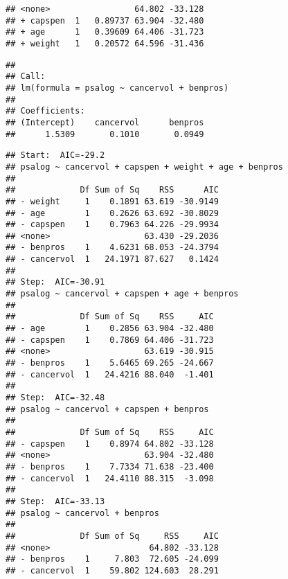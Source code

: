 \begin{knitrout}
\begin{kframe}
\begin{verbatim}
## <none>                 64.802 -33.128
## + capspen  1   0.89737 63.904 -32.480
## + age      1   0.39609 64.406 -31.723
## + weight   1   0.20572 64.596 -31.436
\end{verbatim}
\begin{alltt}
\end{alltt}
\begin{verbatim}
##
## Call:
## lm(formula = psalog ~ cancervol + benpros)
##
## Coefficients:
## (Intercept)    cancervol      benpros
##      1.5309       0.1010       0.0949
\end{verbatim}
\begin{alltt}
 \hlkwb{<-}
    \hlstd{(} \hlopt{~}  \hlopt{+}  \hlopt{+}  \hlopt{+}  \hlopt{+} 
     \hlstd{=} \hlstd{(} \hlstd{=} \hlopt{~}\hlstd{),}
     \hlstd{=} \hlstd{)}
\end{alltt}
\begin{verbatim}
## Start:  AIC=-29.2
## psalog ~ cancervol + capspen + weight + age + benpros
##
##             Df Sum of Sq    RSS      AIC
## - weight     1    0.1891 63.619 -30.9149
## - age        1    0.2626 63.692 -30.8029
## - capspen    1    0.7963 64.226 -29.9934
## <none>                   63.430 -29.2036
## - benpros    1    4.6231 68.053 -24.3794
## - cancervol  1   24.1971 87.627   0.1424
##
## Step:  AIC=-30.91
## psalog ~ cancervol + capspen + age + benpros
##
##             Df Sum of Sq    RSS     AIC
## - age        1    0.2856 63.904 -32.480
## - capspen    1    0.7869 64.406 -31.723
## <none>                   63.619 -30.915
## - benpros    1    5.6465 69.265 -24.667
## - cancervol  1   24.4216 88.040  -1.401
##
## Step:  AIC=-32.48
## psalog ~ cancervol + capspen + benpros
##
##             Df Sum of Sq    RSS     AIC
## - capspen    1    0.8974 64.802 -33.128
## <none>                   63.904 -32.480
## - benpros    1    7.7334 71.638 -23.400
## - cancervol  1   24.4110 88.315  -3.098
##
## Step:  AIC=-33.13
## psalog ~ cancervol + benpros
##
##             Df Sum of Sq     RSS     AIC
## <none>                    64.802 -33.128
## - benpros    1     7.803  72.605 -24.099
## - cancervol  1    59.802 124.603  28.291
\end{verbatim}
\begin{alltt}
\end{alltt}

\end{kframe}
\end{knitrout}
